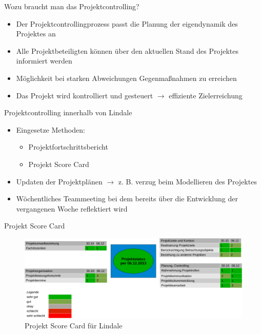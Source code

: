 \documentclass[16pt]{beamer}
\begin{document}
\begin{frame}{Wozu braucht man das Projektcontrolling?}
\begin{itemize}
  \item Der Projektcontrollingprozess passt die Planung der eigendynamik des Projektes an
  \item Alle Projektbeteiligten können über den aktuellen Stand des Projektes informiert werden
  \item Möglichkeit bei starken Abweichungen Gegenmaßnahmen zu erreichen
  \item Das Projekt wird kontrolliert und gesteuert $\rightarrow$ effiziente Zielerreichung
\end{itemize}
\end{frame}

\begin{frame}{Projektcontrolling innerhalb von Lindale}
\begin{itemize}
  \item Eingesetze Methoden:
  \begin{itemize}
    \item Projektfortschrittsbericht
    \item Projekt Score Card
  \end{itemize}
  \item Updaten der Projektplänen $\rightarrow$ z. B. verzug beim Modellieren des Projektes
  \item Wöchentliches Teammeeting bei dem bereits über die Entwicklung der vergangenen Woche reflektiert wird 
\end{itemize}
\end{frame}

\begin{frame}{Projekt Score Card}
\begin{figure}
\includegraphics[width=\textwidth, height=\textheight, keepaspectratio]{image/projekt-score-card}
\caption{Projekt Score Card für Lindale}
\end{figure}
\end{frame}
\end{document}
